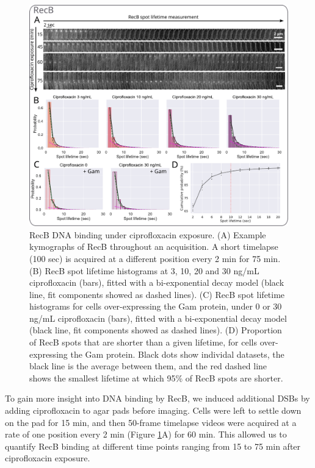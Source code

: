 \begin{figure}[htbp]
    \centering
    \includegraphics[width=\textwidth]{Figures/Fig2_cipro_nSpots.pdf}
    \caption{RecB DNA binding under ciprofloxacin exposure. (A) Example kymographs of RecB throughout an acquisition. A short timelapse (100 sec) is acquired at a different position every 2 min for 75 min. (B) RecB spot lifetime histograms at 3, 10, 20 and 30 ng/mL ciprofloxacin (bars), fitted with a bi-exponential decay model (black line, fit components showed as dashed lines). (C) RecB spot lifetime histograms for cells over-expressing the Gam protein, under 0 or 30 ng/mL ciprofloxacin (bars), fitted with a bi-exponential decay model (black line, fit components showed as dashed lines). (D) Proportion of RecB spots that are shorter than a given lifetime, for cells over-expressing the Gam protein. Black dots show individal datasets, the black line is the average between them, and the red dashed line shows the smallest lifetime at which 95\% of RecB spots are shorter.}
    \label{Fig:lifetime_fits}
\end{figure}

To gain more insight into DNA binding by RecB, we induced additional DSBs by adding ciprofloxacin to agar pads before imaging. Cells were left to settle down on the pad for 15 min, and then 50-frame timelapse videos were acquired at a rate of one position every 2 min (Figure \ref{Fig:lifetime_fits}A) for 60 min. This allowed us to quantify RecB binding at different time points ranging from 15 to 75 min after ciprofloxacin exposure.

